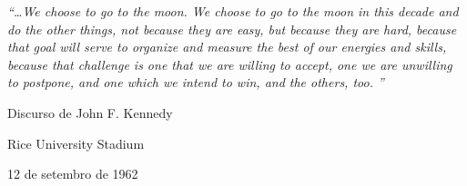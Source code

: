 \vspace*{\fill}
\begin{center}

    \Huge

    \textit{
    ``…We choose to go to the moon.
    We choose to go to the moon in this decade and do the other things, not because they are easy, but because they are hard, because that goal will serve to organize and measure the best of our energies and skills, because that challenge is one that we are willing to accept, one we are unwilling to postpone, and one which we intend to win, and the others, too. ''}

    \Large

    Discurso de John F. Kennedy

    Rice University Stadium

    12 de setembro de 1962

\end{center}
\vspace*{\fill}